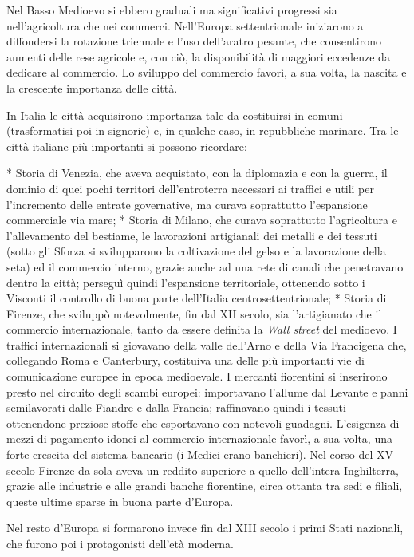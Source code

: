 Nel Basso Medioevo si ebbero graduali ma significativi progressi sia 
nell'agricoltura che nei commerci. Nell'Europa settentrionale iniziarono a 
diffondersi la rotazione triennale e l'uso dell'aratro pesante, 
che consentirono aumenti delle rese agricole e, con ciò, la disponibilità di 
maggiori eccedenze da dedicare al commercio. Lo sviluppo del commercio favorì, 
a sua volta, la nascita e la crescente importanza delle città.

In Italia le città acquisirono importanza tale da costituirsi in comuni 
(trasformatisi poi in signorie) e, in qualche caso, in 
repubbliche marinare. Tra le città italiane più importanti si possono ricordare:

* Storia di Venezia, che aveva acquistato, con la diplomazia e con 
la guerra, il dominio di quei pochi territori dell'entroterra necessari ai 
traffici e utili per l'incremento delle entrate governative, ma curava 
soprattutto l'espansione commerciale via mare;
* Storia di Milano, che curava soprattutto l'agricoltura e 
l'allevamento del bestiame, le lavorazioni artigianali dei metalli e dei 
tessuti (sotto gli Sforza si svilupparono la coltivazione del gelso e la 
lavorazione della seta) ed il commercio interno, grazie anche ad una rete di 
canali che penetravano dentro la città; perseguì quindi l'espansione 
territoriale, ottenendo sotto i Visconti il controllo di buona parte 
dell'Italia 
centrosettentrionale;
* Storia di Firenze, che sviluppò notevolmente, fin dal XII 
secolo, sia l'artigianato che il commercio internazionale, tanto da essere 
definita la \emph{Wall street} del medioevo. I traffici internazionali si 
giovavano della valle dell'Arno e della Via Francigena che, 
collegando Roma e Canterbury, costituiva una delle più importanti vie 
di comunicazione europee in epoca medioevale. I mercanti fiorentini si 
inserirono presto nel circuito degli scambi europei: importavano l'allume 
dal Levante e panni semilavorati dalle Fiandre e 
dalla Francia; raffinavano quindi i tessuti ottenendone preziose stoffe che 
esportavano con notevoli guadagni. L'esigenza di mezzi di pagamento idonei al 
commercio internazionale favorì, a sua volta, una forte crescita del 
sistema bancario (i Medici erano banchieri). Nel corso del XV 
secolo Firenze da sola aveva un reddito superiore a quello dell'intera 
Inghilterra, grazie alle industrie e alle grandi banche fiorentine, circa 
ottanta tra sedi e filiali, queste ultime sparse in buona parte d'Europa.

Nel resto d'Europa si formarono invece fin dal XIII secolo i primi 
Stati nazionali, che furono poi i protagonisti dell'età 
moderna.

